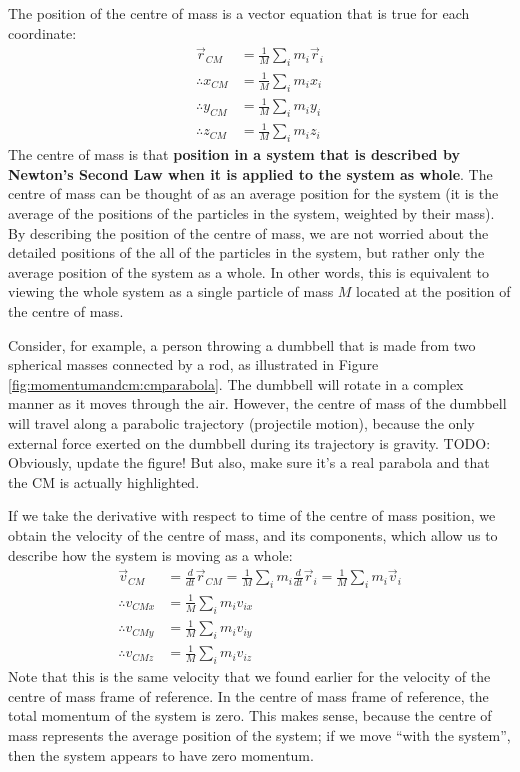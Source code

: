 The position of the centre of mass is a vector equation that is true for each coordinate:
\begin{align}
\vec r_{CM} &=\frac{1}{M}\sum_i m_i\vec r_i\nonumber\\
\therefore x_{CM} &= \frac{1}{M}\sum_i m_i x_i\nonumber\\
\therefore y_{CM} &= \frac{1}{M}\sum_i m_i y_i\nonumber\\
\therefore z_{CM} &= \frac{1}{M}\sum_i m_i z_i
\end{align}
The centre of mass is that \textbf{position in a system that is described by Newton's Second Law when it is applied to the system as whole}. The centre of mass can be thought of as an average position for the system (it is the average of the positions of the particles in the system, weighted by their mass). By describing the position of the centre of mass, we are not worried about the detailed positions of the all of the particles in the system, but rather only the average position of the system as a whole. In other words, this is equivalent to viewing the whole system as a single particle of mass $M$ located at the position of the centre of mass. 

Consider, for example, a person throwing a dumbbell that is made from two spherical masses connected by a rod, as illustrated in Figure \ref{fig:momentumandcm:cmparabola}. The dumbbell will rotate in a complex manner as it moves through the air. However, the centre of mass of the dumbbell will travel along a parabolic trajectory (projectile motion), because the only external force exerted on the dumbbell during its trajectory is gravity.
TODO: Obviously, update the figure! But also, make sure it's a real parabola and that the CM is actually highlighted. 


If we take the derivative with respect to time of the centre of mass position, we obtain the velocity of the centre of mass, and its components, which allow us to describe how the system is moving as a whole:
\begin{align}
\vec v_{CM} &= \frac{d}{dt}\vec r_{CM} = \frac{1}{M}\sum_i m_i\frac{d}{dt}\vec r_i=  \frac{1}{M}\sum_i m_i\vec v_i\nonumber\\
\therefore v_{CMx} &= \frac{1}{M}\sum_i m_i v_{ix}\nonumber\\
\therefore v_{CMy} &= \frac{1}{M}\sum_i m_i v_{iy}\nonumber\\
\therefore v_{CMz} &= \frac{1}{M}\sum_i m_i v_{iz}
\end{align}
Note that this is the same velocity that we found earlier for the velocity of the centre of mass frame of reference. In the centre of mass frame of reference, the total momentum of the system is zero. This makes sense, because the centre of mass represents the average position of the system; if we move ``with the system'', then the system appears to have zero momentum. 

